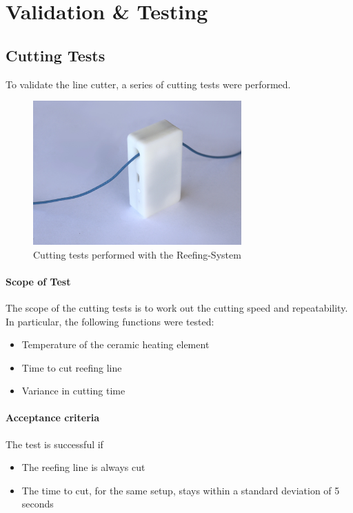 \chapter{Validation \& Testing}

\section{Cutting Tests}
To validate the line cutter, a series of cutting tests were performed. 

\begin{figure}[h!]
    \centering
	\includegraphics[width=8cm]{images/cutting-test}
	\caption{Cutting tests performed with the Reefing-System}
	\label{fig:cutting-test}
\end{figure}

\subsubsection{Scope of Test}
The scope of the cutting tests is to work out the cutting speed and repeatability. In particular, the following functions were tested:
\begin{itemize}
    \item Temperature of the ceramic heating element
    \item Time to cut reefing line 
    \item Variance in cutting time
\end{itemize}

\subsubsection{Acceptance criteria}
The test is successful if
\begin{itemize}
    \item The reefing line is always cut
    \item The time to cut, for the same setup, stays within a standard deviation of 5 seconds 
\end{itemize}

